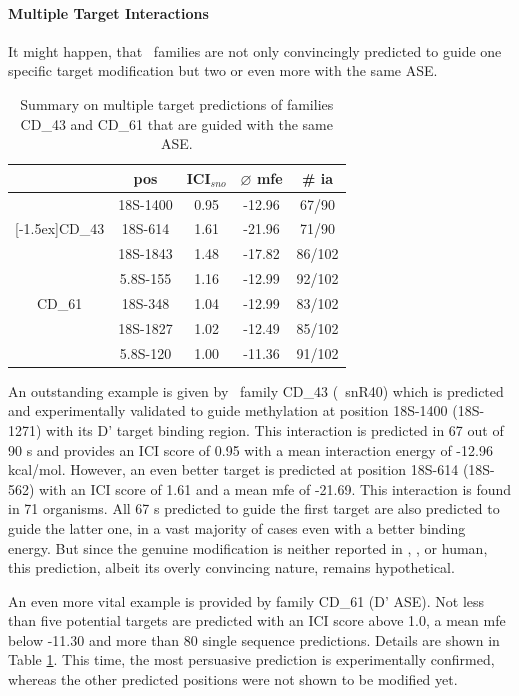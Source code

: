 \paragraph{\textbf{Multiple Target Interactions}}
It might happen, that \sno\ families are not only convincingly
predicted to guide one specific target modification but two or even
more with the same ASE.
\begin{table}
  \caption{Summary on
    multiple target predictions of families CD\_43 and CD\_61 that are guided with the same ASE.}
  \label{tab:redundant_predictions}
  \begin{center}
    \begin{footnotesize}
      \begin{tabular}{c|c|c|c|c}
        &pos&ICI$_{sno}$&$\varnothing$
          mfe&\# ia\\
        \hline
        &18S-1400&0.95&-12.96&67/90\\
        \raisebox{1.5ex}[-1.5ex]{CD\_43}&18S-614&1.61&-21.96&71/90\\
        \hline
        &18S-1843&1.48&-17.82&86/102\\
        &5.8S-155&1.16&-12.99&92/102\\
        CD\_61&18S-348&1.04&-12.99&83/102\\
        &18S-1827&1.02&-12.49&85/102\\
        &5.8S-120&1.00&-11.36&91/102\\
      \end{tabular}
    \end{footnotesize}
  \end{center}
\end{table}
An outstanding example is given by \cd\ family
CD\_43 (\sce\ snR40) which is predicted and experimentally validated to guide
methylation at position 18S-1400 (18S-1271) with its D' target binding
region. This interaction is predicted in 67 out of 90 \sno s and provides
an ICI score of 0.95 with a mean interaction energy of -12.96
kcal/mol. However, an even better target is predicted at position
18S-614 (18S-562) with an ICI score of 1.61 and a mean mfe of
-21.69. This interaction is found in 71 organisms. All 67 \sno s
predicted to guide the first target are also predicted to guide the
latter one, in a vast majority of cases even with a better binding
energy. But since the genuine modification is neither reported in
\sce, \ncr, or human, this prediction, albeit its overly convincing
nature, remains hypothetical. 

An even more vital example is provided by family CD\_61 (D' ASE).
Not less than five potential targets are predicted with an ICI score
above 1.0, a mean mfe below -11.30 and more than 80 single sequence
predictions. Details are shown in Table
\ref{tab:redundant_predictions}. This time, the most persuasive
prediction is experimentally confirmed, whereas the other predicted
positions were not shown to be modified yet. 
